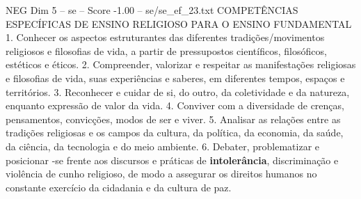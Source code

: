 \begin{textsample}{NEG Dim 5 – se – Score -1.00 – se/se\_ef\_23.txt}  \label{ex:f5_neg_156}
COMPETÊNCIAS ESPECÍFICAS DE ENSINO RELIGIOSO PARA O ENSINO FUNDAMENTAL 1.
Conhecer os aspectos estruturantes das diferentes tradições/movimentos religiosos e filosofias de vida, a partir de pressupostos científicos, filosóficos, estéticos e éticos. 2.
Compreender, valorizar e respeitar as manifestações religiosas e filosofias de vida, suas experiências e saberes, em diferentes tempos, espaços e territórios. 3.
Reconhecer e cuidar de si, do outro, da coletividade e da natureza, enquanto expressão de valor da vida. 4.
Conviver com a diversidade de crenças, pensamentos, convicções, modos de ser e viver. 5.
Analisar as relações entre as tradições religiosas e os campos da cultura, da política, da economia, da saúde, da ciência, da tecnologia e do meio ambiente. 6.
Debater, problematizar e posicionar -se frente aos discursos e práticas de \textbf{intolerância}, discriminação e violência de cunho religioso, de modo a assegurar os direitos humanos no constante exercício da cidadania e da cultura de paz.

\end{textsample}
